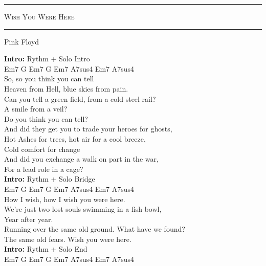 \documentclass[10pt, twoside, a4paper]{article}
\begin{document}
\begin{center}

	\hrule \vspace{0.2cm}
     	\textsc{\LARGE Wish You Were Here}
	\vspace{0.2cm} \hrule \vspace{0.2cm}
      	{\large Pink Floyd}
      	
\end{center}


		
\textbf{Intro:} Rythm + Solo Intro \\
Em7 G Em7 G Em7 A7sus4 Em7 A7sus4 \\

So, so you think you can tell \\
Heaven from Hell, blue skies from pain.\\
Can you tell a green field, from a cold steel rail? \\
A smile from a veil? \\
Do you think you can tell? \\
And did they get you to trade your heroes for ghosts, \\
Hot Ashes for trees, hot air for a cool breeze, \\
Cold comfort for change \\
And did you exchange a walk on part in the war, \\
For a lead role in a cage? \\

\textbf{Intro:} Rythm + Solo Bridge \\
Em7 G Em7 G Em7 A7sus4 Em7 A7sus4 \\

How I wish, how I wish you were here.\\
We're just two lost souls swimming in a fish bowl, \hspace{16pt}\\
Year after year. \hspace{16pt}\\
Running over the same old ground. What have we found? \\
The same old fears. Wish you were here. \\

\textbf{Intro:} Rythm + Solo End \\
Em7 G Em7 G Em7 A7sus4 Em7 A7sus4 \\

\newpage



\newpage


\end{document}
